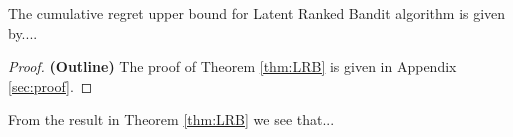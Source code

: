 \begin{theorem}
\label{thm:LRB}
The cumulative regret upper bound for Latent Ranked Bandit algorithm is given by....
\end{theorem}

\begin{proof} \textbf{(Outline)}
The proof of Theorem \ref{thm:LRB} is given in Appendix \ref{sec:proof}. 
\end{proof}

\begin{discussion}
\label{disc:proof}
From the result in Theorem \ref{thm:LRB} we see that...
\end{discussion}